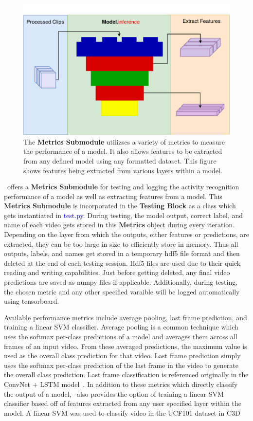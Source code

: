 \documentclass{llncs}
\begin{document}
\begin{figure}[b!]
\centering
\includegraphics[width=0.7\columnwidth]{images/extract_features.pdf}
\caption{The \textbf{Metrics Submodule} utilizses a variety of metrics to measure the performance of a model.
It also allows features to be extracted from any defined model using any formatted dataset.
This figure shows features being extracted from various layers within a model.}
\label{fig:extract_features}
\end{figure}

\acro~offers a \textbf{Metrics Submodule} for testing and logging the activity recognition performance of a model as well as extracting features from a model.
This \textbf{Metrics Submodule} is incorporated in the \textbf{Testing Block} as a class which gets instantiated in \textcolor{blue}{test.py}.
During testing, the model output, correct label, and name of each video gets stored in this \textbf{Metrics} object during every iteration.
Depending on the layer from which the outputs, either features or predictions, are extracted, they can be too large in size to efficiently store in memory.
Thus all outputs, labels, and names get stored in a temporary hdf5 file format and then deleted at the end of each testing session.
Hdf5 files are used due to their quick reading and writing capabilities.
Just before getting deleted, any final video predictions are saved as numpy files if applicable.
Additionally, during testing, the chosen metric and any other specified varaible will be logged automatically using tensorboard.

Available performance metrics include average pooling, last frame prediction, and training a linear SVM classifier.
Average pooling is a common technique which uses the softmax per-class predictions of a model and averages them across all frames of an input video.
From these averaged predictions, the maximum value is used as the overall class prediction for that video.
Last frame prediction simply uses the softmax per-class prediction of the last frame in the video to generate the overall class prediction.
Last frame classification is referenced originally in the ConvNet + LSTM model~\cite{}.
In addition to these metrics which directly classify the output of a model, \acro~also provides the option of training a linear SVM classifier based off of features extracted from any user specified layer within the model.
A linear SVM was used to classify video in the UCF101 dataset in C3D~\cite{}
\end{document}
